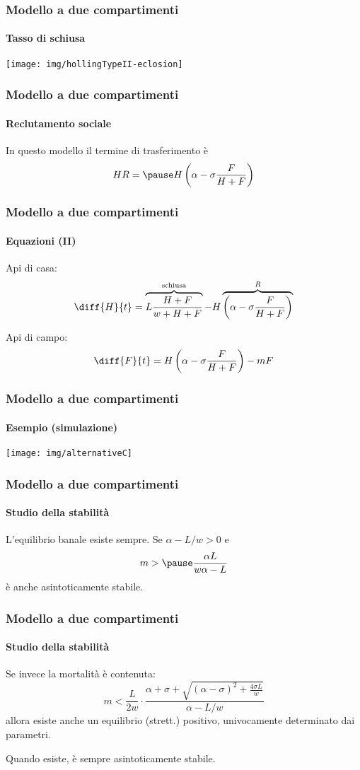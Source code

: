 \documentclass[]{beamer} %
\begin{document}
\begin{frame}
    \frametitle{Modello a due compartimenti}
    \framesubtitle{Tasso di schiusa}

    \begin{center}
        \texttt{[image: img/hollingTypeII-eclosion]}
    \end{center}
\end{frame}


\begin{frame}
    \frametitle{Modello a due compartimenti}
    \framesubtitle{Reclutamento sociale}

    In questo modello il termine di trasferimento è
    $$H R = \pause H \left( \alpha - \sigma \frac{F}{H+F} \right)$$
\end{frame}

\begin{frame}
    \frametitle{Modello a due compartimenti}
    \framesubtitle{Equazioni (II)}

    Api di casa:
    $$\diff{H}{t} = \overbrace{L \frac{H+F}{w+H+F}}^{\text{schiusa}} - H
    \overbrace{\left( \alpha - \sigma \frac{F}{H+F} \right)}^{R} $$

    Api di campo:
    $$\diff{F}{t} = H \left( \alpha - \sigma \frac{F}{H+F} \right) - mF $$
\end{frame}

\begin{frame}
    \frametitle{Modello a due compartimenti}
    \framesubtitle{Esempio (simulazione)}

    \begin{center}
        \texttt{[image: img/alternativeC]}
    \end{center}
\end{frame}


\begin{frame}
    \frametitle{Modello a due compartimenti}
    \framesubtitle{Studio della stabilità}

    L'equilibrio banale esiste sempre. Se $\alpha -L/w>0$ e
    $$m> \pause \frac{\alpha L}{w \alpha -L}$$
    è anche asintoticamente stabile.
\end{frame}

\begin{frame}
    \frametitle{Modello a due compartimenti}
    \framesubtitle{Studio della stabilità}

    Se invece la mortalità è contenuta:
    $$m < \frac{L}{2w} \cdot \frac{ \alpha + \sigma + \sqrt{ {(\alpha - \sigma)}^2 + \frac{4 \sigma L}{w} } }{\alpha - L/w}$$
    allora esiste anche un equilibrio (strett.) positivo, univocamente determinato dai parametri.

    \pause
    Quando esiste, è sempre asintoticamente stabile.
\end{frame}
\end{document}
